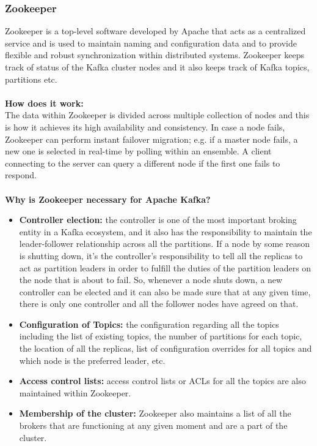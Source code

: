 \documentclass[10pt,a4paper]{article}
\newcommand{\nline}{\\~\\}
\begin{document}
\subsubsection{Zookeeper}
Zookeeper is a top-level software developed by Apache that acts as a centralized service and is used to maintain naming and configuration data and to provide flexible and robust synchronization within distributed systems. Zookeeper keeps track of status of the Kafka cluster nodes and it also keeps track of Kafka topics, partitions etc.
\nline
\textbf{How does it work:} \\
The data within Zookeeper is divided across multiple collection of nodes and this is how it achieves its high availability and consistency. In case a node fails, Zookeeper can perform instant failover migration; e.g. if a master node fails, a new one is selected in real-time by polling within an ensemble. A client connecting to the server can query a different node if the first one fails to respond.
\nline
\textbf{Why is Zookeeper necessary for Apache Kafka?}
\begin{itemize}
	\item \textbf{Controller election:} the controller is one of the most important broking entity in a Kafka ecosystem, and it also has the responsibility to maintain the leader-follower relationship across all the partitions. If a node by some reason is shutting down, it’s the controller’s responsibility to tell all the replicas to act as partition leaders in order to fulfill the duties of the partition leaders on the node that is about to fail. So, whenever a node shuts down, a new controller can be elected and it can also be made sure that at any given time, there is only one controller and all the follower nodes have agreed on that.
	\item \textbf{Configuration of Topics:} the configuration regarding all the topics including the list of existing topics, the number of partitions for each topic, the location of all the replicas, list of configuration overrides for all topics and which node is the preferred leader, etc.
	\item \textbf{Access control lists:} access control lists or ACLs for all the topics are also maintained within Zookeeper.
	\item \textbf{Membership of the cluster:} Zookeeper also maintains a list of all the brokers that are functioning at any given moment and are a part of the cluster.
\end{itemize}
\end{document}
